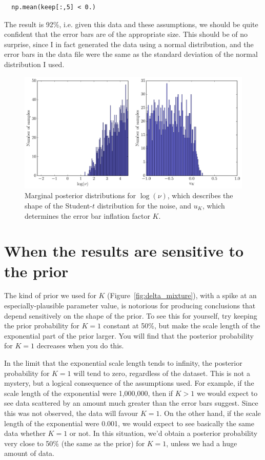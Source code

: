\begin{verbatim}
  np.mean(keep[:,5] < 0.)
\end{verbatim}
The result is 92\%, i.e. given this data and these assumptions, we should be
quite confident that the error bars are of the appropriate size.
This should be of no surprise, since I in fact generated the data using
a normal distribution, and the error bars in the data file were the same
as the standard deviation of the normal distribution I used.

\begin{figure}
\begin{center}
\includegraphics[scale=0.45]{nu_K.pdf}
\caption{Marginal posterior distributions for $\log(\nu)$, which describes the
shape of the Student-$t$ distribution for the noise, and $u_K$, which
determines the error bar inflation factor $K$.
\label{fig:nu_K}}
\end{center}
\end{figure}

\section{When the results are sensitive to the prior}
The kind of prior we used for $K$ (Figure~\ref{fig:delta_mixture}), with
a spike at an especially-plausible parameter value, is
notorious for producing conclusions that depend sensitively on the
shape of the prior. To see this for yourself, try keeping the prior probability
for $K=1$ constant at 50\%, but make the scale length of the exponential
part of the prior larger. You will find that the posterior probability for
$K=1$ decreases when you do this.

In the limit that the exponential scale length tends to infinity, the
posterior probability for $K=1$ will tend to zero, regardless of the dataset.
This is not a mystery, but a logical consequence of the assumptions
used. For example, if the scale length of the exponential were 1,000,000,
then if $K > 1$ we would expect to see data scattered by an amount much
greater than the error bars suggest. Since this was not observed, the data
will favour $K=1$. On the other hand, if the scale length of the exponential
were 0.001, we would expect to see basically the same data whether $K=1$ or not.
In this situation, we'd obtain a posterior probability very close to 50\%
(the same as the prior) for $K=1$, unless we had a huge amount of data.

